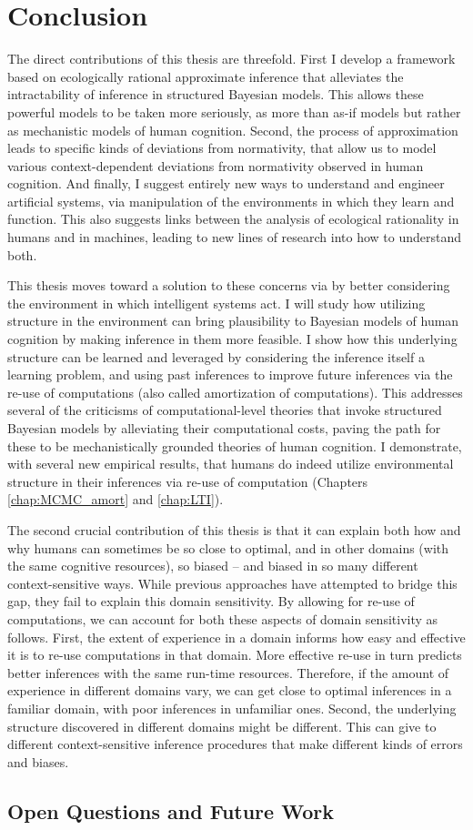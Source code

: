 \chapter{Conclusion}
\label{chap:conclusion}

The direct contributions of this thesis are threefold. First I develop a framework based on ecologically rational approximate inference that alleviates the intractability of inference in structured Bayesian models. This allows these powerful models to be taken more seriously, as more than as-if models but rather as mechanistic models of human cognition. Second, the process of approximation leads to specific kinds of deviations from normativity, that allow us to model various context-dependent deviations from normativity observed in human cognition. And finally, I suggest entirely new ways to understand and engineer artificial systems, via manipulation of the environments in which they learn and function. This also suggests links between the analysis of ecological rationality in humans and in machines, leading to new lines of research into how to understand both.

This thesis moves toward a solution to these concerns via by better considering the environment in which intelligent systems act. I will study how utilizing structure in the environment can bring plausibility to Bayesian models of human cognition by making inference in them more feasible. I show how this underlying structure can be learned and leveraged by considering the inference itself a learning problem, and using past inferences to improve future inferences via the re-use of computations (also called amortization of computations). This addresses several of the criticisms of computational-level theories that invoke structured Bayesian models by alleviating their computational costs, paving the path for these to be mechanistically grounded theories of human cognition. I demonstrate, with several new empirical results, that humans do indeed utilize environmental structure in their inferences via re-use of computation (Chapters \ref{chap:MCMC_amort} and \ref{chap:LTI}). 

The second crucial contribution of this thesis is that it can explain both how and why humans can sometimes be so close to optimal, and in other domains (with the same cognitive resources), so biased -- and biased in so many different context-sensitive ways. While previous approaches have attempted to bridge this gap, they fail to explain this domain sensitivity. By allowing for re-use of computations, we can account for both these aspects of domain sensitivity as follows. First, the extent of experience in a domain informs how easy and effective it is to re-use computations in that domain. More effective re-use in turn predicts better inferences with the same run-time resources. Therefore, if the amount of experience in different domains vary, we can get close to optimal inferences in a familiar domain, with poor inferences in unfamiliar ones. Second, the underlying structure discovered in different domains might be different. This can give to different context-sensitive inference procedures that make different kinds of errors and biases.

\section*{Open Questions and Future Work}